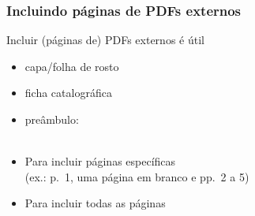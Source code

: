 
\begin{frame}
  \frametitle{Incluindo páginas de PDFs externos}

  \begin{block}{Incluir (páginas de) PDFs externos é útil}
    \begin{itemize}
    \item capa/folha de rosto
    \item ficha catalográfica
    \end{itemize}
  \end{block}

  \begin{block}{}
    \begin{itemize}
    \item preâmbulo: \texttt{\purple{\string\usepackage}}\\\ 
      
    \item Para incluir páginas específicas\\
      (ex.: p.~1, uma página em branco e pp.~2 a 5)\\
      \texttt{\purple{\string}\brown{[pages=\ac{}1,\ac{}\fc{},2-5\fc{}]}}
    \item Para incluir todas as páginas
      \texttt{\purple{\string}\brown{[pages=-]}}
    \end{itemize}
  \end{block}
\end{frame}


